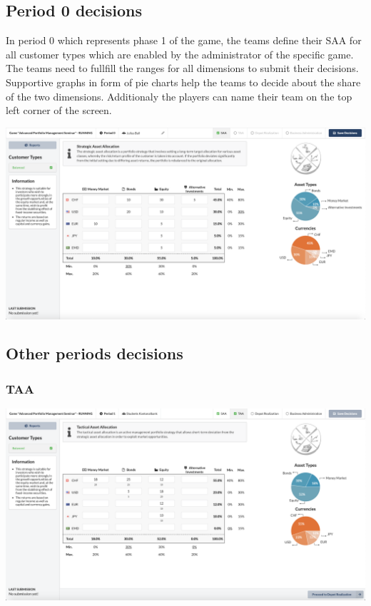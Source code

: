 \subsection{Period 0 decisions}
In period 0 which represents phase 1 of the game, the teams define their SAA for all customer types which are enabled by the administrator of the specific game. The teams need to fullfill the ranges for all dimensions to submit their decisions. Supportive graphs in form of pie charts help the teams to decide about the share of the two dimensions. Additionaly the players can name their team on the top left corner of the screen.
\begin{center}
  \includegraphics[scale=0.2]{img/application-overview/teams/02_period_zero_decisions.png}
\end{center}

\subsection{Other periods decisions}
\subsubsection{TAA}
\begin{center}
  \includegraphics[scale=0.2]{img/application-overview/teams/04_taa.png}
\end{center}

